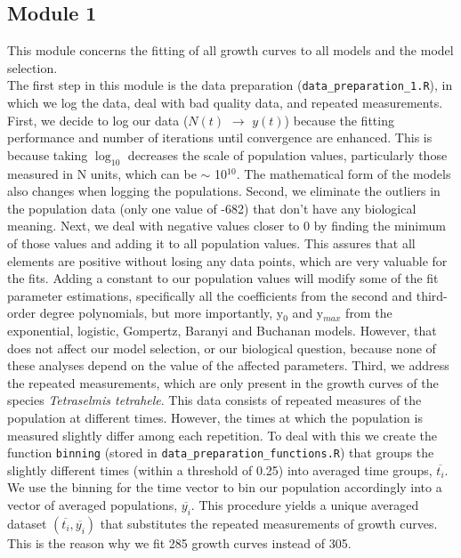 \documentclass[titlepage,11pt]{article}
\begin{document}
\begin{linenumbers}
			\subsection{Module 1}\label{subsec:module1}
			This module concerns the fitting of all growth curves to all models and the model selection.\\
			The first step in this module is the data preparation (\verb|data_preparation_1.R|), in which we log the data, deal with bad quality data, and repeated measurements. First, we decide to log our data ($N(t) $ $\rightarrow$ $y(t)$) because the fitting performance and number of iterations until convergence are enhanced.  This is because taking $ \log_{10} $ decreases the scale of population values, particularly those measured in N units, which can be $ \sim $ 10$^{10} $. The mathematical form of the models also changes when logging the populations. Second, we eliminate the outliers in the population data (only one value of -682) that don't have any biological meaning. Next, we deal with negative values closer to 0 by finding the minimum of those values and adding it to all population values. This assures that all elements are positive without losing any data points, which are very valuable for the fits. Adding a constant to our population values will modify some of the fit parameter estimations, specifically all the coefficients from the second and third-order degree polynomials, but more importantly, y$_0 $ and y$ _{max} $ from the exponential, logistic, Gompertz, Baranyi and Buchanan models. However, that does not affect our model selection, or our biological question, because none of these analyses depend on the value of the affected parameters. Third, we address the repeated measurements, which are only present in the growth curves of the species  \textit{Tetraselmis tetrahele}. This data consists of repeated measures of the population at different times. However, the times at which the population is measured slightly differ among each repetition. To deal with this we create the function \verb|binning| (stored in \verb|data_preparation_functions.R|) that groups the slightly different times (within a threshold of 0.25) into averaged time groups, $  \overline{t_i}$. We use the binning for the time vector to bin our population accordingly into a vector of averaged populations, {$\overline{y_i}$}. This procedure yields a unique averaged dataset $ \left(\overline{t_i}, \overline{y_i}\right) $ that substitutes the repeated measurements of growth curves. This is the reason why we fit 285 growth curves instead of 305.\\
			

\end{linenumbers}
\end{document}
